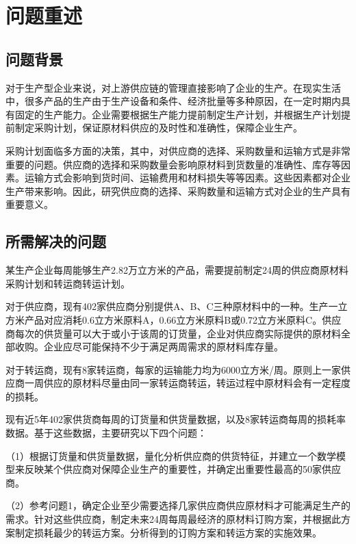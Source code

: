 \documentclass[withoutpreface,bwprint]{cumcmthesis} %
\begin{document}
\section{问题重述}

\subsection{问题背景}

对于生产型企业来说，对上游供应链的管理直接影响了企业的生产。在现实生活中，很多产品的生产由于生产设备和条件、经济批量等多种原因，在一定时期内具有固定的生产能力。企业需要根据生产能力提前制定生产计划，并根据生产计划提前制定采购计划，保证原材料供应的及时性和准确性，保障企业生产。

采购计划面临多方面的决策，其中，对供应商的选择、采购数量和运输方式是非常重要的问题。供应商的选择和采购数量会影响原材料到货数量的准确性、库存等因素。运输方式会影响到货时间、运输费用和材料损失等等因素。这些因素都对企业生产带来影响。因此，研究供应商的选择、采购数量和运输方式对企业的生产具有重要意义。

\subsection{所需解决的问题}

某生产企业每周能够生产2.82万立方米的产品，需要提前制定24周的供应商原材料采购计划和转运商转运计划。

对于供应商，现有402家供应商分别提供A、B、C三种原材料中的一种。生产一立方米产品对应消耗0.6立方米原料A，0.66立方米原料B或0.72立方米原料C。供应商每次的供货量可以大于或小于该周的订货量，企业对供应商实际提供的原材料全部收购。企业应尽可能保持不少于满足两周需求的原材料库存量。

对于转运商，现有8家转运商，每家的运输能力均为6000立方米/周。原则上一家供应商一周供应的原材料尽量由同一家转运商转运，转运过程中原材料会有一定程度的损耗。

现有近5年402家供货商每周的订货量和供货量数据，以及8家转运商每周的损耗率数据。基于这些数据，主要研究以下四个问题：

（1）根据订货量和供货量数据，量化分析供应商的供货特征，并建立一个数学模型来反映某个供应商对保障企业生产的重要性，并确定出重要性最高的50家供应商。

（2）参考问题1，确定企业至少需要选择几家供应商供应原材料才可能满足生产的需求。针对这些供应商，制定未来24周每周最经济的原材料订购方案，并根据此方案制定损耗最少的转运方案。分析得到的订购方案和转运方案的实施效果。
\end{document}
